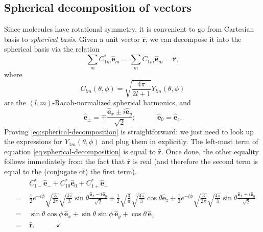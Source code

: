 \documentclass{article}
\theoremstyle{definition}
\newcommand{\f}[2]{\frac{#1}{#2}}
\begin{document}
\subsection{Spherical decomposition of vectors}
Since molecules have rotational symmetry, it is convenient to go from Cartesian basis to \textit{spherical basis}. Given a unit vector $\hat{\bm{r}}$, we can decompose it into the spherical basis via the relation
\begin{equation}\label{eq:spherical-decomposition}
\sum_m C_{1m}^* \hat{\bm{e}}_m = \sum_m C_{1m} \hat{\bm{e}}_m  = \hat{\bm{r}},
\end{equation}
where
\begin{equation}
 C_{lm}(\theta,\phi) = \sqrt{\f{4 \pi }{2l + 1}} Y_{lm}(\theta,\phi)
\end{equation}
are the $(l,m)$-Racah-normalized spherical harmonics, and 
\begin{equation}
\hat{\bm{e}}_\pm = \mp \f{\hat{\bm{e}}_x \pm i \hat{\bm{e}}_y}{\sqrt{2}};
\quad\quad\quad 
\hat{\bm{e}}_0 = \hat{\bm{e}}_z.
\end{equation}
Proving \eqref{eq:spherical-decomposition} is straightforward: we just need to look up the expressions for $Y_{1m}(\theta, \phi)$ and plug them in explicitly. The left-most term of equation \eqref{eq:spherical-decomposition} is equal to $\hat{\bm{r}}$. Once done, the other equality follows immediately from the fact that $\hat{\bm{r}}$ is real (and therefore the second term is equal to the (conjugate of) the first term). 
\begin{eqnarray}
&&C_{1-}^* \hat{\bm{e}}_{-} + 
C_{10}^* \hat{\bm{e}}_{0}  + 
C_{1+}^* \hat{\bm{e}}_{+} \nonumber \\
&=\,\, &\f{1}{2}e^{+i\phi} \sqrt{\f{3}{2\pi}} \sqrt{\f{4\pi}{3}} \sin\theta  \f{\hat{\bm{e}}_x - i \hat{\bm{e}}_y}{\sqrt{2}} 
	+ \f{1}{2}\sqrt{\f{3}{\pi}} \sqrt{\f{4\pi}{3}} \cos\theta  \hat{\bm{e}}_z 
	+ \f{1}{2}e^{-i\phi} \sqrt{\f{3}{2\pi}} \sqrt{\f{4\pi}{3}} \sin\theta  \f{\hat{\bm{e}}_x + i \hat{\bm{e}}_y}{\sqrt{2}} 
	\nonumber \\
&=\,\, & \sin\theta\cos\phi\, {\hat{\bm{e}}}_x + \sin\theta\sin\phi\, {\hat{\bm{e}}}_y + \cos\theta \,{\hat{\bm{e}}}_z
\nonumber \\
&=\,\, & \hat{\bm{r}}. \quad\quad\quad \checkmark
\end{eqnarray}
\end{document}
